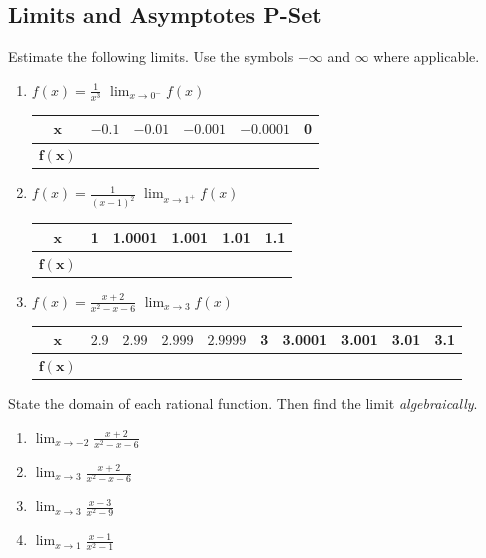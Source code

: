 \documentclass{article}
\newcounter{pset}
\begin{document}
\subsection*{Limits and Asymptotes P-Set}

Estimate the following limits. Use the symbols $-\infty$ and $\infty$ where applicable.
\begin{enumerate}
    \item $f(x) = \frac{1}{x^3}$    \quad $\lim_{x \to 0^-}f(x)$
    \begin{center}
    \begin{tabular}{c|c|c|c|c|c}
        $\pmb{x}$ & $-0.1$ & $-0.01$ & $-0.001$ & $-0.0001$ & 0  \\ \hline 
        $\pmb{f(x)}$ & & & & & \\
    \end{tabular}
    \end{center}
    \item $f(x) = \frac{1}{(x-1)^2}$ \quad $\lim_{x \to 1^+} f(x)$
    \begin{center}
    \begin{tabular}{c|c|c|c|c|c}
        $\pmb{x}$ & 1 & 1.0001 & 1.001 & 1.01 & 1.1 \\ \hline 
        $\pmb{f(x)}$ & & & & &  \\
    \end{tabular}
    \end{center}
    \item $f(x) = \frac{x+2}{x^2-x-6}$ \quad $\lim_{x \to 3} f(x)$
    \begin{center}
    \begin{tabular}{c|c|c|c|c|c|c|c|c|c}
        $\pmb{x}$ & $2.9$ & $2.99$ & $2.999$ & $2.9999$ & 3 & 3.0001 & 3.001 & 3.01 & 3.1 \\ \hline 
        $\pmb{f(x)}$ & & & & & & & & & \\
    \end{tabular}
    \end{center}
\end{enumerate} \setcounter{pset}{\value{enumi}}
\bigskip 

State the domain of each rational function. Then find the limit \emph{algebraically}.
\begin{multicols}{4}
\begin{enumerate}   \setcounter{enumi}{\value{pset}}
    \item $\lim_{x \to -2} \frac{x+2}{x^2-x-6}$
    \item $\lim_{x \to 3} \frac{x+2}{x^2-x-6}$
    \item $\lim_{x \to 3} \frac{x-3}{x^2-9}$
    \item $\lim_{x \to 1} \frac{x-1}{x^2-1}$
\end{enumerate} \setcounter{pset}{\value{enumi}}
\end{multicols}
\bigskip
\end{document}
